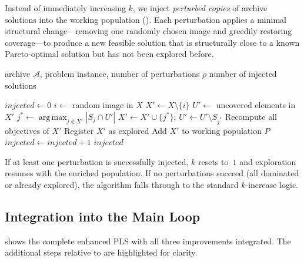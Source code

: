 \documentclass[11pt,a4paper]{article}
\newcommand{\calA}{\mathcal{A}}
\DeclareMathOperator*{\argmax}{arg\,max}
\begin{document}
Instead of immediately increasing $k$, we inject \emph{perturbed copies}
of archive solutions into the working population
().  Each perturbation applies a minimal
structural change---removing one randomly chosen image and greedily
restoring coverage---to produce a new feasible solution that is
structurally close to a known Pareto-optimal solution but has not been
explored before.

\begin{algorithm}[t]
\caption{Perturbation-Based Restart}\label{alg:perturbation}
\begin{algorithmic}[1]
\Input archive $\calA$, problem instance, number of perturbations
  $\rho$
\Output number of injected solutions

\State $\textit{injected} \gets 0$
\ForEach{$X \in \calA$}
    \State $i \gets$ random image in $X$
    \State $X' \gets X \setminus \{i\}$
    \State $U' \gets$ uncovered elements in $X'$
     
      \State $j^* \gets \argmax_{j \notin X'} |S_j \cap U'|$
      \State $X' \gets X' \cup \{j^*\}$; \quad
        $U' \gets U' \setminus S_{j^*}$
    \EndWhile
    \State Recompute all objectives of $X'$
      \State Register $X'$ as explored
      \If{$\calA.\textsc{TryInsert}(X')$}
        \State Add $X'$ to working population $P$
        \State $\textit{injected} \gets \textit{injected} + 1$
      \EndIf
    \EndIf
  \EndFor
\EndFor
\State \Return $\textit{injected}$
\end{algorithmic}
\end{algorithm}

If at least one perturbation is successfully injected, $k$ resets to~$1$
and exploration resumes with the enriched population.  If no
perturbations succeed (all dominated or already explored), the algorithm
falls through to the standard $k$-increase logic.

\subsection{Integration into the Main Loop}

 shows the complete enhanced PLS with all three
improvements integrated.  The additional steps relative to
 are highlighted for clarity.
\end{document}
